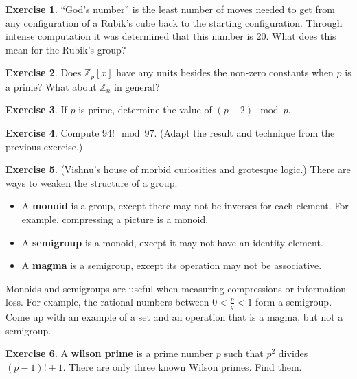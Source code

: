 \documentclass[11pt]{article}
\theoremstyle{definition}
\newtheorem{exercise}{Exercise}
\numberwithin{thm}{section}
\begin{document}
\begin{exercise} ``God's number'' is the least number of moves needed to get from any configuration of a Rubik's cube back to the starting configuration. Through intense computation it was determined that this number is 20. What does this mean for the Rubik's group?
\end{exercise}

\begin{exercise} Does $\mathbb{Z}_p [x]$ have any units besides the non-zero constants when $p$ is a prime? What about $\mathbb{Z}_n$ in general?
\end{exercise}

\begin{exercise} If $p$ is prime, determine the value of $(p-2) \mod p$.
\end{exercise}

\begin{exercise} Compute $94! \mod 97$. (Adapt the result and technique from the previous exercise.)
\end{exercise}

\begin{exercise} (Vishnu's house of morbid curiosities and grotesque logic.) There are ways to weaken the structure of a group.
\begin{itemize}
	\item A \textbf{monoid} is a group, except there may not be inverses for each element. For example, compressing a picture is a monoid.
	\item A \textbf{semigroup} is a monoid, except it may not have an identity element.
    \item A \textbf{magma} is a semigroup, except its operation may not be associative. 
\end{itemize}

Monoids and semigroups are useful when measuring compressions or information loss. For example, the rational numbers between $0 < \frac{p}{q} < 1$ form a semigroup. Come up with an example of a set and an operation that is a magma, but not a semigroup.
\end{exercise}

\begin{exercise} A \textbf{wilson prime} is a prime number $p$ such that $p^2$ divides $(p-1)! + 1$. There are only three known Wilson primes. Find them.
\end{exercise}
\end{document}
